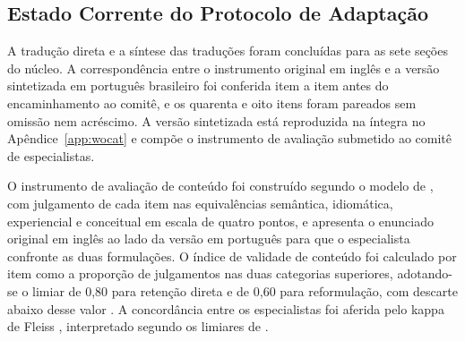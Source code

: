 \documentclass[preprint,authoryear,12pt]{elsarticle}
\newcommand{\fonte}[1]{%
  \par\vspace{2pt}\noindent{\footnotesize Fonte: #1}\par}
\begin{document}
\begin{figure}[H]
{}
\vspace{2pt}
\fonte{\textbf{Elaborado pelos autores} (2026).}
\end{figure}

\subsection{Estado Corrente do Protocolo de Adaptação}

A tradução direta e a síntese das traduções foram concluídas para as sete seções do núcleo. A correspondência entre o instrumento original em inglês \citep{Liniger2019} e a versão sintetizada em português brasileiro foi conferida item a item antes do encaminhamento ao comitê, e os quarenta e oito itens foram pareados sem omissão nem acréscimo. A versão sintetizada está reproduzida na íntegra no Apêndice~\ref{app:wocat} e compõe o instrumento de avaliação submetido ao comitê de especialistas.

O instrumento de avaliação de conteúdo foi construído segundo o modelo de \citet{Beaton2000}, com julgamento de cada item nas equivalências semântica, idiomática, experiencial e conceitual em escala de quatro pontos, e apresenta o enunciado original em inglês ao lado da versão em português para que o especialista confronte as duas formulações. O índice de validade de conteúdo foi calculado por item como a proporção de julgamentos nas duas categorias superiores, adotando-se o limiar de 0,80 para retenção direta e de 0,60 para reformulação, com descarte abaixo desse valor \citep{Hernandez-Nieto2002,Cassepp-Borges2010}. A concordância entre os especialistas foi aferida pelo kappa de Fleiss \citep{Fleiss1971}, interpretado segundo os limiares de \citet{Landis1977}.
\end{document}
